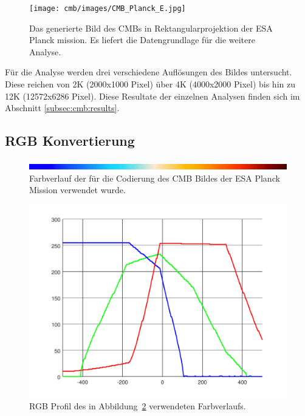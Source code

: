 \begin{figure}
	\centering
	\texttt{[image: cmb/images/CMB\_Planck\_E.jpg]}
	\caption{Das generierte Bild des CMBs in Rektangularprojektion der ESA 
	Planck mission. Es liefert die Datengrundlage für die weitere Analyse.}
	\label{fig:cmb-rectangular}
\end{figure}

Für die Analyse werden drei verschiedene Auflösungen des Bildes untersucht. 
Diese reichen von 2K (2000x1000 Pixel) über 4K (4000x2000 Pixel) bis hin zu 12K 
(12572x6286 Pixel). Diese Resultate der einzelnen Analysen finden sich im 
Abschnitt \ref{subsec:cmb:results}.

\subsection{RGB Konvertierung}



\begin{figure}
	\centering
	\includegraphics[width=\linewidth]{cmb/images/color-strip-full.png}
	\caption{Farbverlauf der für die Codierung des CMB Bildes der ESA Planck 
		Mission verwendet wurde.}
	\label{fig:color-strip-orig}
\end{figure}

\begin{figure}
	\centering
	\includegraphics[width=\linewidth]{cmb/converter/rgb-graph.pdf}
	\caption{RGB Profil des in Abbildung~\ref{fig:color-strip-orig} 
		verwendeten Farbverlaufs.}
	\label{fig:color-strip-orig-rgb}
\end{figure}

